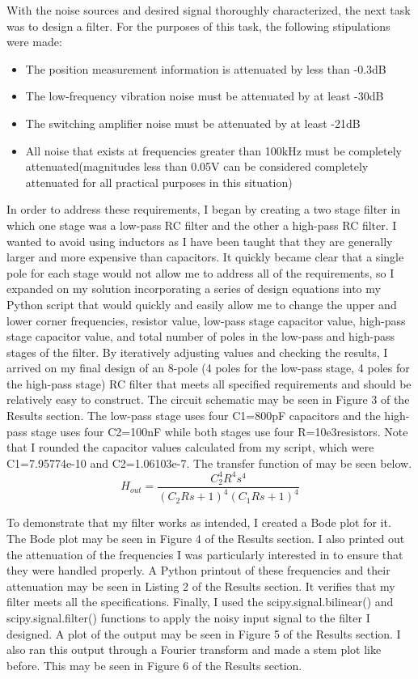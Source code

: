 \documentclass[12pt]{article}
\begin{document}
    \par With the noise sources and desired signal thoroughly characterized, the next task was to design a filter. For the purposes of this task, the following stipulations were made:
    \begin{itemize}
        \item The position measurement information is attenuated by less than -0.3dB
        \item The low-frequency vibration noise must be attenuated by at least -30dB
        \item The switching amplifier noise must be attenuated by at least -21dB
        \item All noise that exists at frequencies greater than 100kHz must be completely attenuated(magnitudes less than 0.05V can be considered completely attenuated for all practical purposes in this situation)
    \end{itemize}
    In order to address these requirements, I began by creating a two stage filter in which one stage was a low-pass RC filter and the other a high-pass RC filter. I wanted to avoid using inductors as I have been taught that they are generally larger and more expensive than capacitors. It quickly became clear that a single pole for each stage would not allow me to address all of the requirements, so I expanded on my solution incorporating a series of design equations into my Python script that would quickly and easily allow me to change the upper and lower corner frequencies, resistor value, low-pass stage capacitor value, high-pass stage capacitor value, and total number of poles in the low-pass and high-pass stages of the filter. By iteratively adjusting values and checking the results, I arrived on my final design of an 8-pole (4 poles for the low-pass stage, 4 poles for the high-pass stage) RC filter that meets all specified requirements and should be relatively easy to construct. The circuit schematic may be seen in Figure 3 of the Results section. The low-pass stage uses four C1=800pF capacitors and the high-pass stage uses four C2=100nF while both stages use four R=10e3\ohm resistors. Note that I rounded the capacitor values calculated from my script, which were C1=7.95774e-10 and C2=1.06103e-7. The transfer function of may be seen below.
    $$ H_{out} = \frac{C_2^4 R^4 s^4}{(C_2 R s + 1)^4 (C_1 R s + 1)^4} $$
    
    \par To demonstrate that my filter works as intended, I created a Bode plot for it. The Bode plot may be seen in Figure 4 of the Results section. I also printed out the attenuation of the frequencies I was particularly interested in to ensure that they were handled properly. A Python printout of these frequencies and their attenuation may be seen in Listing 2 of the Results section. It verifies that my filter meets all the specifications. Finally, I used the scipy.signal.bilinear() and scipy.signal.filter() functions to apply the noisy input signal to the filter I designed. A plot of the output may be seen in Figure 5 of the Results section. I also ran this output through a Fourier transform and made a stem plot like before. This may be seen in Figure 6 of the Results section.
\end{document}
